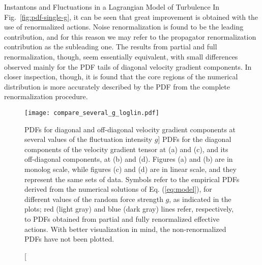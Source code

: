 \begin{chapter}{Instantons and Fluctuations in a Lagrangian Model of Turbulence}
In Fig.~\ref{fig:pdf-single-g}, it can be seen that great improvement is obtained with the use of renormalized actions. Noise renormalization is found to be the leading contribution, and for this reason we may refer to the propagator renormalization contribution as the subleading one.
The results from partial and full renormalization, though, seem essentially equivalent, with small differences observed mainly for the PDF tails of diagonal velocity gradient components. In closer inspection, though, it is found that the core regions of the numerical distribution is more accurately described by the PDF from the complete renormalization procedure.


\begin{figure}[h]
 \centering
 \texttt{[image: compare\_several\_g\_loglin.pdf]}
 \caption
 [PDFs for diagonal and off-diagonal velocity gradient components at several values of the fluctuation intensity $g$]
 {PDFs for the diagonal components of the velocity gradient tensor
 at (a) and (c), and its off-diagonal components, at (b) and (d).
 Figures (a) and (b) are in monolog scale, while figures
 (c) and (d) are in linear scale, and they represent the same
 sets of data.
 Symbols refer to the empirical PDFs derived from the numerical solutions of Eq. (\ref{eq:model}), for different values of the random force
 strength $g$, as indicated in the plots; red (light gray) and blue
 (dark gray) lines refer, respectively, to PDFs obtained from partial
 and fully renormalized effective actions. With better
 visualization in mind, the non-renormalized PDFs have not been plotted.}
 \label{fig:pdf-several-g}
\end{figure}


\end{chapter}
